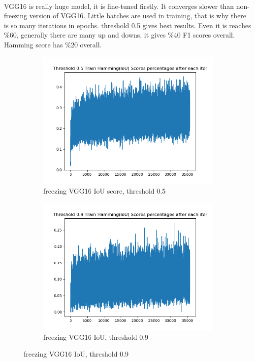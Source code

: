 \documentclass[12pt]{article}
\begin{document}
\paragraph{}VGG16 is really huge model, it is fine-tuned firstly. It converges slower than non-freezing version of VGG16. Little batches are used in training, that is why there is so many iterations in epochs. threshold 0.5 gives best results. Even it is reaches \%60, generally there are many up and downs, it gives \%40 F1 scores overall. Hamming score has \%20 overall.   

\begin{figure}[!ht]
\centering
\begin{subfigure}{.5\textwidth}
	\centering
	\includegraphics[width=1\linewidth]{vgg16-0_26-lazy-1-train-scores-hs-5.png}
	\caption{\label{vgg16:vgg16-0_26-lazy-1-train-scores-hs-5}freezing VGG16 IoU score, threshold 0.5}
\end{subfigure}%
\begin{subfigure}{.5\textwidth}
	\centering
	\includegraphics[width=1\linewidth]{vgg16-0_26-lazy-1-train-scores-hs-9.png}
	\caption{\label{vgg16:vgg16-0_26-lazy-1-train-scores-hs-9}freezing VGG16 IoU, threshold 0.9}
\end{subfigure}
\end{figure}
\end{document}
